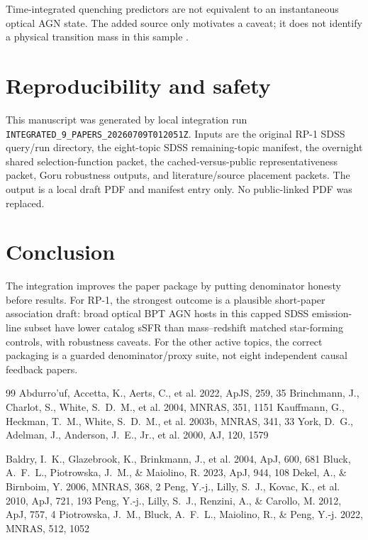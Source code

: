 \documentclass[twocolumn]{aastex702}
\begin{document}
Time-integrated quenching predictors are not equivalent to an instantaneous optical AGN state. The added source only motivates a caveat; it does not identify a physical transition mass in this sample \citep{bluck2023}.

\section{Reproducibility and safety}\label{sec:repro}
This manuscript was generated by local integration run \texttt{INTEGRATED\_9\_PAPERS\_20260709T012051Z}. Inputs are the original RP-1 SDSS query/run directory, the eight-topic SDSS remaining-topic manifest, the overnight shared selection-function packet, the cached-versus-public representativeness packet, Goru robustness outputs, and literature/source placement packets. The output is a local draft PDF and manifest entry only. No public-linked PDF was replaced.

\section{Conclusion}\label{sec:conclusion}
The integration improves the paper package by putting denominator honesty before results. For RP-1, the strongest outcome is a plausible short-paper association draft: broad optical BPT AGN hosts in this capped SDSS emission-line subset have lower catalog sSFR than mass--redshift matched star-forming controls, with robustness caveats. For the other active topics, the correct packaging is a guarded denominator/proxy suite, not eight independent causal feedback papers.


\begin{thebibliography}{99}
 Abdurro'uf, Accetta, K., Aerts, C., et al. 2022, ApJS, 259, 35
 Brinchmann, J., Charlot, S., White, S.~D.~M., et al. 2004, MNRAS, 351, 1151
 Kauffmann, G., Heckman, T.~M., White, S.~D.~M., et al. 2003b, MNRAS, 341, 33
 York, D.~G., Adelman, J., Anderson, J.~E., Jr., et al. 2000, AJ, 120, 1579

 Baldry, I.~K., Glazebrook, K., Brinkmann, J., et al. 2004, ApJ, 600, 681
 Bluck, A.~F.~L., Piotrowska, J.~M., \& Maiolino, R. 2023, ApJ, 944, 108
 Dekel, A., \& Birnboim, Y. 2006, MNRAS, 368, 2
 Peng, Y.-j., Lilly, S.~J., Kovac, K., et al. 2010, ApJ, 721, 193
 Peng, Y.-j., Lilly, S.~J., Renzini, A., \& Carollo, M. 2012, ApJ, 757, 4
 Piotrowska, J.~M., Bluck, A.~F.~L., Maiolino, R., \& Peng, Y.-j. 2022, MNRAS, 512, 1052
\end{thebibliography}
\end{document}
